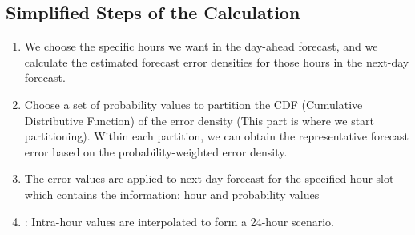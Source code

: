 \documentclass[12pt]{article}
\begin{document}
\subsection{Simplified Steps of the Calculation}
\begin{enumerate}
	\item We choose the specific hours we want in the day-ahead forecast, and we calculate the estimated forecast error densities for those hours in the next-day forecast. 
	\item Choose a set of probability values to partition the CDF (Cumulative Distributive Function) of the error density (This part is where we start partitioning). Within each partition, we can obtain the representative forecast error based on the probability-weighted error density.
	\item The error values are applied to next-day forecast for the specified hour slot which contains the information: hour and probability values
	\item : Intra-hour values are interpolated to form a 24-hour scenario. 
\end{enumerate}
\end{document}
